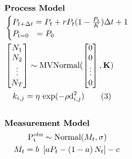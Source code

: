 \documentclass[12pt,preview,border=0]{standalone}
\begin{document}
  
\begin{align*} 
    \intertext{\centering \textbf{Process Model}}
    &\begin{cases}
        P_{t + \Delta t} = P_t + r P_t (1 - \frac{P_t}{K}) \Delta t + 1 \\
        P_\text{t=0}  ~~ = P_0 \\
    \end{cases} 
    \\
    &\begin{bmatrix}
        N_1 \\
        N_2 \\
        \vdots \\
        N_T
    \end{bmatrix} \sim \text{MVNormal}( 
        \begin{bmatrix}
            0 \\
            0 \\
            \vdots \\
            0
        \end{bmatrix}, 
    \textbf{K} ) 
    \\
    & ~~~ k_{i,j} = \eta ~ \text{exp}( -\rho \text{d}^\text{2}_{i,j} ) \label{eq:dgp} \tag{3} \\
    \\
    \intertext{\centering \textbf{Measurement Model}}
    & \hphantom{xxxxx} \mathrm{ P_{t}^{obs} }  \sim \text{Normal}( M_t, \sigma )  \\
    & \hphantom{xx} M_t                     =  b ~ \left[ a P_t - \left( 1 - a \right) N_t \right] - c 
\end{align*}
\\
\end{document}
